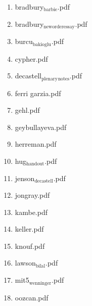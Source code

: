 \documentclass[11pt]{article}
\begin{document}
\begin{enumerate}
\begin{enumerate}
\begin{enumerate}
\item bradbury$_{\text{barbie}}$.pdf
\label{sec-1-1-1-1-11-24-41-1-2-32}

\item bradbury$_{\text{neworderessay}}$.pdf
\label{sec-1-1-1-1-11-24-41-1-2-33}

\item burcu$_{\text{bakioglu}}$.pdf
\label{sec-1-1-1-1-11-24-41-1-2-34}

\item cypher.pdf
\label{sec-1-1-1-1-11-24-41-1-2-35}

\item decastell$_{\text{plenary}}$$_{\text{notes}}$.pdf
\label{sec-1-1-1-1-11-24-41-1-2-36}

\item ferri garzia.pdf
\label{sec-1-1-1-1-11-24-41-1-2-37}

\item gehl.pdf
\label{sec-1-1-1-1-11-24-41-1-2-38}

\item geybullayeva.pdf
\label{sec-1-1-1-1-11-24-41-1-2-39}

\item herreman.pdf
\label{sec-1-1-1-1-11-24-41-1-2-40}

\item hug$_{\text{handout}}$.pdf
\label{sec-1-1-1-1-11-24-41-1-2-41}

\item jenson$_{\text{decastell}}$.pdf
\label{sec-1-1-1-1-11-24-41-1-2-42}

\item jongray.pdf
\label{sec-1-1-1-1-11-24-41-1-2-43}

\item kambe.pdf
\label{sec-1-1-1-1-11-24-41-1-2-44}

\item keller.pdf
\label{sec-1-1-1-1-11-24-41-1-2-45}

\item knouf.pdf
\label{sec-1-1-1-1-11-24-41-1-2-46}

\item lawson$_{\text{bilal}}$.pdf
\label{sec-1-1-1-1-11-24-41-1-2-47}

\item mit5$_{\text{wenninger}}$.pdf
\label{sec-1-1-1-1-11-24-41-1-2-48}

\item oozcan.pdf
\label{sec-1-1-1-1-11-24-41-1-2-49}


\end{enumerate}
\end{enumerate}
\end{enumerate}
\end{document}
